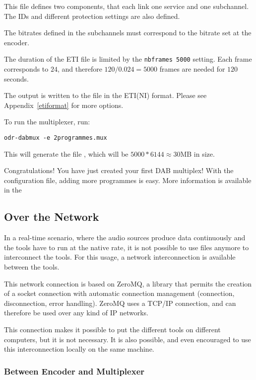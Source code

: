 This file defines two components, that each link one service and one
subchannel. The IDs and different protection settings are also defined.

The bitrates defined in the subchannels must correspond to the bitrate set at the encoder.

The duration of the ETI file is limited by the \lstinline{nbframes 5000} setting. Each frame
corresponds to $24$\ms, and therefore $120 / 0.024 = 5000$ frames are needed
for $120$ seconds.

The output is written to the file  in the ETI(NI) format. Please
see Appendix~\ref{etiformat} for more options.

To run the multiplexer, run:
\begin{lstlisting}
odr-dabmux -e 2programmes.mux
\end{lstlisting}

This will generate the file , which will be $5000 * 6144
\approx 30$\si{MB} in size.

Congratulations! You have just created your first DAB multiplex! With the configuration file,
adding more programmes is easy. More information is available in the 

\subsection{Over the Network}
In a real-time scenario, where the audio sources produce data continuously and the tools have to
run at the native rate, it is not possible to use files anymore to interconnect the tools. For this
usage, a network interconnection is available between the tools.

This network connection is based on ZeroMQ, a library that permits the creation of a socket
connection with automatic connection management (connection, disconnection, error handling).
ZeroMQ uses a TCP/IP connection, and can therefore be used over any kind of IP networks.

This connection makes it possible to put the different tools on different computers, but it is not
necessary. It is also possible, and even encouraged to use this interconnection locally on the same
machine.

\subsubsection{Between Encoder and Multiplexer}

